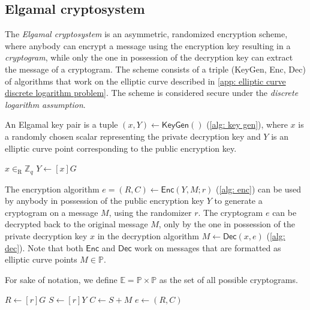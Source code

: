\subsection{Elgamal cryptosystem} \label{app: elgamal cryptosystem}
The \textit{Elgamal cryptosystem} is an asymmetric, randomized encryption scheme, where anybody can encrypt a message using the encryption key resulting in a \textit{cryptogram}, while only the one in possession of the decryption key can extract the message of a cryptogram. The scheme consists of a triple (\textsf{KeyGen}, \textsf{Enc}, \textsf{Dec}) of algorithms that work on the elliptic curve described in \cref{app: elliptic curve discrete logarithm problem}. The scheme is considered secure under the \textit{discrete logarithm assumption}.

An Elgamal key pair is a tuple $(x, Y) \gets \mathsf{KeyGen}()$ (\cref{alg: key gen}), where $x$ is a randomly chosen scalar representing the private decryption key and $Y$ is an elliptic curve point corresponding to the public encryption key.

\begin{algorithm}[ht]
    \DontPrintSemicolon
    \caption{$\mathsf{KeyGen}()$}
    \label{alg: key gen}
    
    $x \in_\mathrm{R} \mathbb{Z}_q$ \;
    $Y \gets [x]G$ \;
     
\end{algorithm}

The encryption algorithm $e = (R, C) \gets \mathsf{Enc} (Y, M; r)$ (\cref{alg: enc}) can be used by anybody in possession of the public encryption key $Y$ to generate a cryptogram on a message $M$, using the randomizer $r$. The cryptogram $e$ can be decrypted back to the original message $M$, only by the one in possession of the private decryption key $x$ in the decryption algorithm $M \gets \mathsf{Dec} (x, e)$ (\cref{alg: dec}). Note that both $\mathsf{Enc}$ and $\mathsf{Dec}$ work on messages that are formatted as elliptic curve points $M \in \mathbb{P}$.

For sake of notation, we define $\mathbb{E} = \mathbb{P} \times \mathbb{P}$ as the set of all possible cryptograms.

\begin{algorithm}[ht]
    \DontPrintSemicolon
    \caption{$\mathsf{Enc} (Y, M; r)$}
    \label{alg: enc}
    
    $R \gets [r]G$ \;
    $S \gets [r]Y$ \;
    $C \gets S + M$ \;
    $e \gets (R, C)$ \;
     
\end{algorithm}

